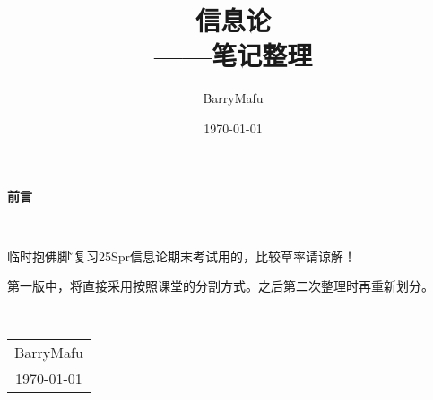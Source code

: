 \documentclass[12pt, a4paper, oneside]{ctexbook}
\title{{\Huge{\textbf{信息论}}}\\——笔记整理}
\author{BarryMafu}
\date{\today}
\begin{document}
\maketitle

\setcounter{page}{1}

\begin{center}
    \Huge\textbf{前言}
\end{center}~\

临时抱佛脚\~，复习25Spr信息论期末考试用的，比较草率请谅解！

第一版中，将直接采用按照课堂的分割方式。之后第二次整理时再重新划分。

~\\
\begin{flushright}
    \begin{tabular}{c}
        BarryMafu\\
        \today
    \end{tabular}
\end{flushright}

\newpage
{}
\setcounter{page}{1}
\tableofcontents
\newpage
\setcounter{page}{1}













\end{document}
